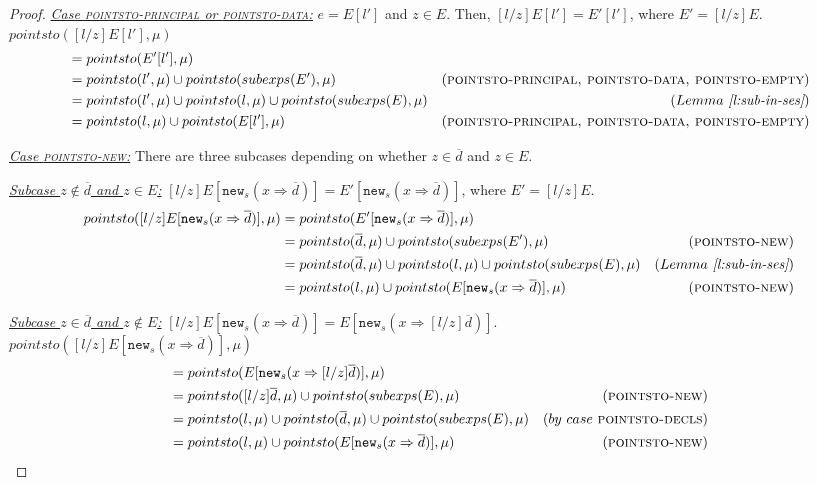 \documentclass{llncs}
\newcommand{\keywadj}[1]{\mathtt{#1}}
\begin{document}
\begin{proof}
\noindent\underline{\textit{Case \textsc{pointsto-principal} or \textsc{pointsto-data}:}} $e = E[l']$ and $z \in E$. Then, $[l / z]E[l'] = E'[l']$, where \mbox{$E' = [l / z]E$}.\\
$pointsto([l / z]E[l'], \mu)$
\vspace{-7pt}
\begin{align*}
&= pointsto(E'[l'], \mu)\\
&= pointsto(l', \mu) \cup pointsto(subexps(E'), \mu) & (\textsc{pointsto-principal, pointsto-data, pointsto-empty})\\
&= pointsto(l', \mu) \cup pointsto(l, \mu) \cup pointsto(subexps(E), \mu) & (Lemma~\textit{\ref{l:sub-in-ses}})\\
&= pointsto(l, \mu) \cup pointsto(E[l'], \mu) & (\textsc{pointsto-principal, pointsto-data, pointsto-empty})
\end{align*}

\noindent\underline{\textit{Case \textsc{pointsto-new}:}} There are three subcases depending on whether $z \in \overline{d}$ and $z \in E$.

\noindent\underline{\textit{Subcase $z \not\in \overline{d}$ and $z \in E$:}} $[l / z]E[\keywadj{new}_s(x \Rightarrow \overline{d})] = E'[\keywadj{new}_s(x \Rightarrow \overline{d})]$, where $E' = [l / z]E$.
\begin{align*}
pointsto([l / z]E[\keywadj{new}_s(x \Rightarrow \overline{d})], \mu) &= pointsto(E'[\keywadj{new}_s(x \Rightarrow \overline{d})], \mu)\\
&= pointsto(\overline{d}, \mu) \cup pointsto(subexps(E'), \mu) & (\textsc{pointsto-new})\\
&= pointsto(\overline{d}, \mu) \cup pointsto(l, \mu) \cup pointsto(subexps(E), \mu) & (Lemma~\textit{\ref{l:sub-in-ses}})\\
&= pointsto(l, \mu) \cup pointsto(E[\keywadj{new}_s(x \Rightarrow \overline{d})], \mu) & (\textsc{pointsto-new})
\end{align*}

\noindent\underline{\textit{Subcase $z \in \overline{d}$ and $z \not\in E$:}} $[l / z]E[\keywadj{new}_s(x \Rightarrow \overline{d})] = E[\keywadj{new}_s(x \Rightarrow [l / z]\overline{d})]$.\\
$pointsto([l / z]E[\keywadj{new}_s(x \Rightarrow \overline{d})], \mu)$
\vspace{-7pt}
\begin{align*}
&= pointsto(E[\keywadj{new}_s(x \Rightarrow [l / z]\overline{d})], \mu)\\
&= pointsto([l / z]\overline{d}, \mu) \cup pointsto(subexps(E), \mu) & (\textsc{pointsto-new})\\
&= pointsto(l, \mu) \cup pointsto(\overline{d}, \mu) \cup pointsto(subexps(E), \mu) & (by~case~\textsc{pointsto-decls})\\
&= pointsto(l, \mu) \cup pointsto(E[\keywadj{new}_s(x \Rightarrow \overline{d})], \mu) & (\textsc{pointsto-new})
\end{align*}


\end{proof}
\end{document}
